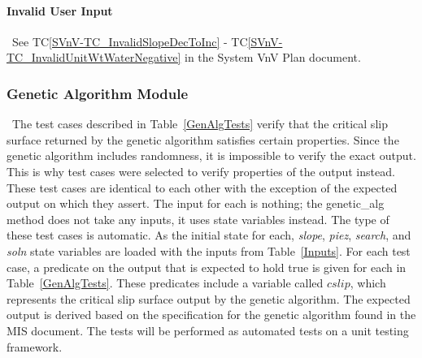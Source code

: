 \documentclass[12pt, titlepage]{article}
\newcommand{\tcref}[1]{TC\ref{#1}}
\begin{document}
\paragraph{Invalid User Input}
~\newline \noindent See \tcref{SVnV-TC_InvalidSlopeDecToInc} - 
\tcref{SVnV-TC_InvalidUnitWtWaterNegative} in the System VnV Plan document.

\subsubsection{Genetic Algorithm Module}

~\newline \noindent The test cases described in Table~\ref{GenAlgTests} 
verify that the critical slip surface returned by the genetic algorithm 
satisfies certain properties. Since the genetic algorithm includes randomness, 
it is impossible to verify the exact output. This is why test cases were 
selected to verify properties of the output instead. These test cases are 
identical to each other with the exception of the expected output on which they 
assert. The input for each is nothing; the genetic\_alg method does not take 
any inputs, it uses state variables instead. The type of these test cases is 
automatic. As the initial state for each, \textit{slope}, \textit{piez}, 
\textit{search}, and \textit{soln} state variables are loaded with the inputs 
from Table~\ref{Inputs}. For each test case, a predicate on the output that is 
expected to hold true is given for each in Table~\ref{GenAlgTests}. These 
predicates include a variable called $cslip$, which represents the critical 
slip surface output by the genetic algorithm. The expected output is derived 
based on the specification for the genetic algorithm found in the MIS document. 
The tests will be performed as automated tests on a unit testing framework.
\end{document}
